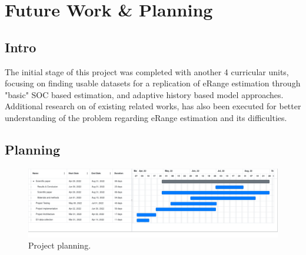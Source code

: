 \chapter{Future Work \& Planning}
\label{cha:planning}

\section{Intro}
\label{sec:planningIntro}

The initial stage of this project was
completed with another 4 curricular units,
focusing on finding usable datasets for 
a replication of \gls{eRange} estimation
through "basic" \gls{SOC} based estimation, 
and adaptive history based model approaches.
Additional research on of existing related works,
has also been executed for better understanding
of the problem regarding \gls{eRange} estimation
and its difficulties.

\section{Planning}
\label{sec:planningPlanning}

\begin{figure}[H]
    \begin{center}
        \includegraphics[scale=0.27]{../figures/planning}
        \caption{Project planning.}
    \end{center}
\end{figure}